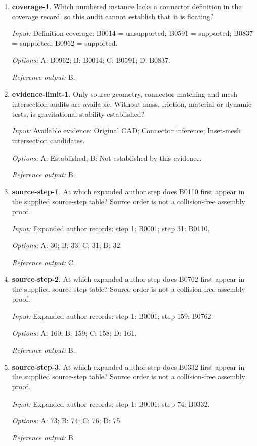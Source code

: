 \begin{enumerate}
\item \textbf{coverage-1}. Which numbered instance lacks a connector definition in the coverage record, so this audit cannot establish that it is floating?\par {\small \textit{Input:} Definition coverage: B0014 = unsupported; B0591 = supported; B0837 = supported; B0962 = supported. \par\textit{Options:} A: B0962; B: B0014; C: B0591; D: B0837. \par\textit{Reference output:} B.}
\item \textbf{evidence-limit-1}. Only source geometry, connector matching and mesh intersection audits are available. Without mass, friction, material or dynamic tests, is gravitational stability established?\par {\small \textit{Input:} Available evidence: Original CAD; Connector inference; Inset-mesh intersection candidates. \par\textit{Options:} A: Established; B: Not established by this evidence. \par\textit{Reference output:} B.}
\item \textbf{source-step-1}. At which expanded author step does B0110 first appear in the supplied source-step table? Source order is not a collision-free assembly proof.\par {\small \textit{Input:} Expanded author records: step 1: B0001; step 31: B0110. \par\textit{Options:} A: 30; B: 33; C: 31; D: 32. \par\textit{Reference output:} C.}
\item \textbf{source-step-2}. At which expanded author step does B0762 first appear in the supplied source-step table? Source order is not a collision-free assembly proof.\par {\small \textit{Input:} Expanded author records: step 1: B0001; step 159: B0762. \par\textit{Options:} A: 160; B: 159; C: 158; D: 161. \par\textit{Reference output:} B.}
\item \textbf{source-step-3}. At which expanded author step does B0332 first appear in the supplied source-step table? Source order is not a collision-free assembly proof.\par {\small \textit{Input:} Expanded author records: step 1: B0001; step 74: B0332. \par\textit{Options:} A: 73; B: 74; C: 76; D: 75. \par\textit{Reference output:} B.}

\end{enumerate}
